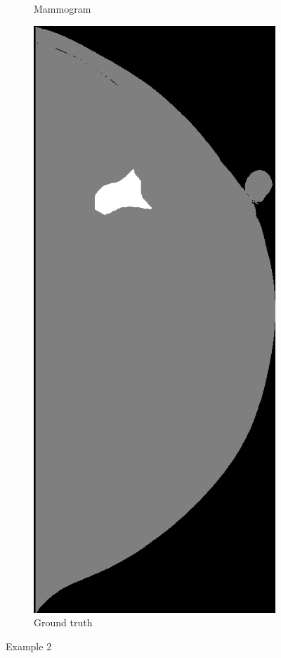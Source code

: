 \begin{figure}[h]
\begin{subfigure}{0.2\textwidth}
		\caption{Mammogram}
	\end{subfigure}
	\quad
	\begin{subfigure}{0.2\textwidth}
		\centering
			\includegraphics[width=\textwidth]{plots/examples/label_2.png}
         \caption{Ground truth}
	\end{subfigure}
	\caption[Example 2]{Example 2}
\end{figure}

